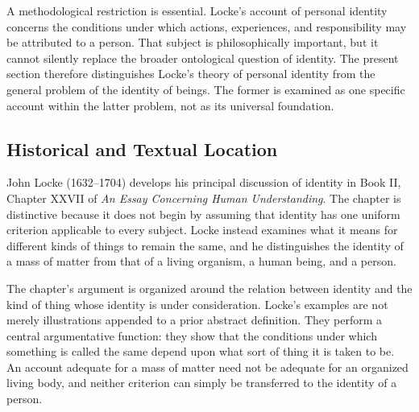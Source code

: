 \label{para:VS.B01.P01.C08.S08.SS01.P004}

A methodological restriction is essential. Locke's account
of personal identity concerns the conditions under which
actions, experiences, and responsibility may be attributed
to a person. That subject is philosophically important, but
it cannot silently replace the broader ontological question
of identity. The present section therefore distinguishes
Locke's theory of personal identity from the general problem
of the identity of beings. The former is examined as one
specific account within the latter problem, not as its
universal foundation.



\subsection{Historical and Textual Location}
\label{subsec:ch08-locke-historical}

\label{para:VS.B01.P01.C08.S08.SS02.P001}

John Locke (1632--1704) develops his principal discussion
of identity in Book II, Chapter XXVII of
\textit{An Essay Concerning Human Understanding}. The
chapter is distinctive because it does not begin by
assuming that identity has one uniform criterion applicable
to every subject. Locke instead examines what it means for
different kinds of things to remain the same, and he
distinguishes the identity of a mass of matter from that
of a living organism, a human being, and a person.
\cite[II.xxvii]{LockeEssay}

\label{para:VS.B01.P01.C08.S08.SS02.P002}

The chapter's argument is organized around the relation
between identity and the kind of thing whose identity is
under consideration. Locke's examples are not merely
illustrations appended to a prior abstract definition.
They perform a central argumentative function: they show
that the conditions under which something is called the
same depend upon what sort of thing it is taken to be.
An account adequate for a mass of matter need not be
adequate for an organized living body, and neither
criterion can simply be transferred to the identity of
a person.

